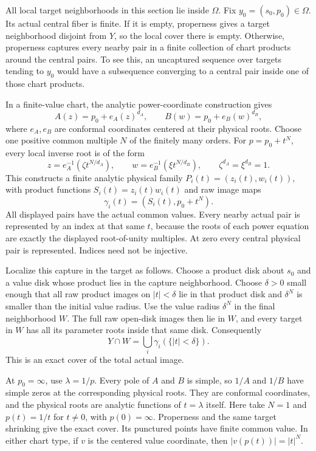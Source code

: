 \documentclass[11pt]{article}
\numberwithin{equation}{section}
\begin{document}
All local target neighborhoods in this section lie inside $\Omega$.
Fix $y_0=(s_0,p_0)\in\Omega$. Its actual central fiber is finite.
If it is empty, properness gives a target neighborhood disjoint from $Y$,
so the local cover there is empty. Otherwise, properness captures every
nearby pair in a finite collection of chart products around the central
pairs. To see this, an uncaptured sequence over targets tending to $y_0$
would have a subsequence converging to a central pair inside one of those
chart products.

In a finite-value chart, the analytic power-coordinate construction gives
\[
 A(z)=p_0+e_A(z)^{d_A},\qquad
 B(w)=p_0+e_B(w)^{d_B},
\]
where $e_A,e_B$ are conformal coordinates centered at their physical roots.
Choose one positive common multiple $N$ of the finitely many orders.
For $p=p_0+t^N$, every local inverse root is of the form
\[
 z=e_A^{-1}(\zeta t^{N/d_A}),\qquad
 w=e_B^{-1}(\xi t^{N/d_B}),\qquad
 \zeta^{d_A}=\xi^{d_B}=1.
\]
This constructs a finite analytic physical family $P_i(t)=(z_i(t),w_i(t))$,
with product functions $S_i(t)=z_i(t)w_i(t)$ and raw image maps
\begin{equation}\label{eq:raw}
 \gamma_i(t)=(S_i(t),p_0+t^N).
\end{equation}
All displayed pairs have the actual common values. Every nearby actual
pair is represented by an index at that same $t$, because the roots of each
power equation are exactly the displayed root-of-unity multiples. At zero
every central physical pair is represented. Indices need not be injective.

Localize this capture in the target as follows. Choose a product disk about
$s_0$ and a value disk whose product lies in the capture neighborhood.
Choose $\delta>0$ small enough that all raw product images on $|t|<\delta$
lie in that product disk and $\delta^N$ is smaller than the initial value
radius. Use the value radius $\delta^N$ in the final neighborhood $W$.
The full raw open-disk images then lie in $W$, and every target in $W$
has all its parameter roots inside that same disk. Consequently
\begin{equation}\label{eq:cover}
 Y\cap W=\bigcup_i\gamma_i(\{|t|<\delta\}).
\end{equation}
This is an exact cover of the total actual image.

At $p_0=\infty$, use $\lambda=1/p$. Every pole of $A$ and $B$ is simple,
so $1/A$ and $1/B$ have simple zeros at the corresponding physical roots.
They are conformal coordinates, and the physical roots are analytic
functions of $t=\lambda$ itself. Here take $N=1$ and $p(t)=1/t$ for
$t\ne0$, with $p(0)=\infty$. Properness and the same target shrinking give
the exact cover. Its punctured points have finite common value. In either
chart type, if $v$ is the centered value coordinate, then
$|v(p(t))|=|t|^N$.
\end{document}
